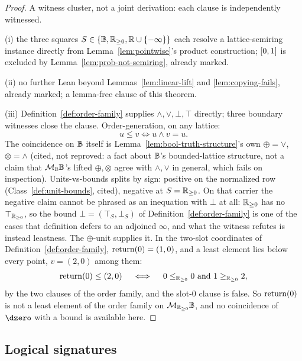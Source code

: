 \begin{proof}
\leanok
A witness cluster, not a joint derivation: each clause is independently
witnessed.

(i) the three squares $S \in \{\mathbb B,\mathbb R_{\ge 0},\mathbb R \cup \{-\infty\}\}$ each resolve a
lattice-semiring instance directly from Lemma~\ref{lem:pointwise}'s
product construction; $[0,1]$ is excluded by
Lemma~\ref{lem:prob-not-semiring}, already marked.

(ii) no further Lean beyond Lemmas~\ref{lem:linear-lift} and
\ref{lem:copying-fails}, already marked; a lemma-free clause of this
theorem.

(iii) Definition~\ref{def:order-family} supplies $\wedge,\vee,\bot,\top$
directly; three boundary witnesses close the clause. Order-generation,
on any lattice:
\[
  u \le v \iff u \wedge v = u.
\]
The coincidence on $\mathbb B$ itself is Lemma~\ref{lem:bool-truth-structure}'s
own $\oplus=\vee$, $\otimes=\wedge$ (cited, not reproved: a fact about
$\mathbb B$'s bounded-lattice structure, not a claim that $\mathcal M_{\mathbb B}\mathbb B$'s
lifted $\oplus,\otimes$ agree with $\wedge,\vee$ in general, which
fails on inspection). Units-vs-bounds splits by sign: positive on the
normalized row (Class~\ref{def:unit-bounds}, cited), negative at
$S=\mathbb R_{\ge 0}$. On that carrier the negative claim cannot be phrased as an
inequation with $\bot$ at all: $\mathbb R_{\ge 0}$ has no $\top_{\mathbb R_{\ge 0}}$, so the
bound $\bot = (\top_S,\bot_S)$ of Definition~\ref{def:order-family} is
one of the cases that definition defers to an adjoined $\infty$, and
what the witness refutes is instead leastness. The $\oplus$-unit
supplies it. In the two-slot coordinates of
Definition~\ref{def:order-family}, $\mathrm{return}(0) = (1,0)$, and a least
element lies below every point, $v = (2,0)$ among them:
\[
  \mathrm{return}(0) \le (2,0)
  \quad\iff\quad
  0 \le_{\mathbb R_{\ge 0}} 0 \ \text{and}\ 1 \ge_{\mathbb R_{\ge 0}} 2,
\]
by the two clauses of the order family, and the slot-$0$ clause is
false. So $\mathrm{return}(0)$ is not a least element of the order family on
$\mathcal M_{\mathbb R_{\ge 0}}\mathbb B$, and no coincidence of $\dzero$ with a bound is
available here.
\end{proof}

\subsection{Logical signatures}  %
\label{sec:logical-signatures}

